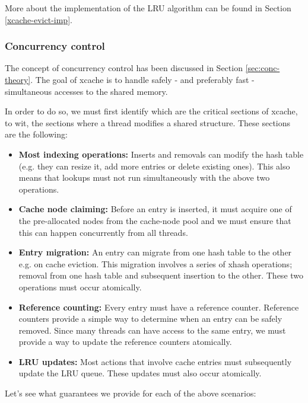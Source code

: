 More about the implementation of the LRU algorithm can be found in Section 
\ref{xcache-evict-imp}.

\subsubsection{Concurrency control}

The concept of concurrency control has been discussed in Section 
\ref{sec:conc-theory}.  The goal of xcache is to handle safely - and preferably 
fast - simultaneous accesses to the shared memory.

In order to do so, we must first identify which are the critical sections of 
xcache, to wit, the sections where a thread modifies a shared structure. These 
sections are the following:

\begin{itemize}
	\item
		\textbf{Most indexing operations:} Inserts and removals can 
		modify the hash table (e.g. they can resize it, add more 
		entries or delete existing ones). This also means that lookups 
		must not run simultaneously with the above two operations.
	\item
		\textbf{Cache node claiming:} Before an entry is inserted, it 
		must	acquire one of the pre-allocated nodes from the 
		cache-node pool and we must ensure that this can happen 
		concurrently from all threads.
	\item
		\textbf{Entry migration:} An entry can migrate from one hash 
		table to the other e.g. on cache eviction. This migration 
		involves a series of xhash operations; removal from one hash 
		table and subsequent insertion to the other. These two 
		operations must occur atomically.
	\item
		\textbf{Reference counting:} Every entry must have a reference 
		counter.  Reference counters provide a simple way to determine 
		when an entry can be safely removed. Since many threads can 
		have access to the same entry, we must provide a way to update 
		the reference counters atomically.
	\item
		\textbf{LRU updates:} Most actions that involve cache entries 
		must subsequently update the LRU queue. These updates must also 
		occur atomically.
\end{itemize}

Let's see what guarantees we provide for each of the above scenarios:

